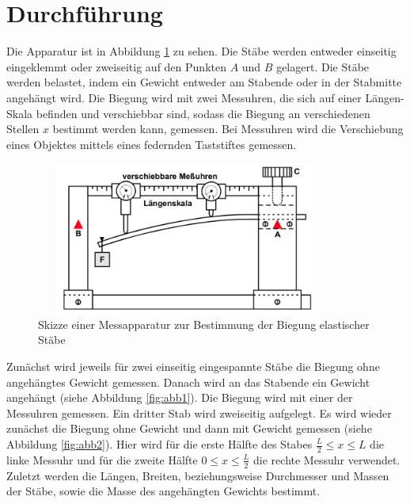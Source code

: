 \section{Durchführung}
Die Apparatur ist in Abbildung \ref{fig:abb3} zu sehen.
Die Stäbe werden entweder einseitig eingeklemmt oder zweiseitig
auf den Punkten $A$ und $B$ gelagert. Die Stäbe werden belastet, indem
ein Gewicht entweder am Stabende oder in der Stabmitte angehängt wird.
Die Biegung wird mit zwei Messuhren, die sich auf einer Längen-Skala befinden
und verschiebbar sind, sodass die Biegung an verschiedenen Stellen $x$ bestimmt
werden kann, gemessen. Bei Messuhren wird die Verschiebung eines Objektes mittels
eines federnden Taststiftes gemessen. %
\begin{figure}
    \centering
\includegraphics[width= 10cm, height= 5cm]{./plots/abb3.png}
\caption{Skizze einer Messapparatur zur Bestimmung der Biegung elastischer Stäbe}
\label{fig:abb3}
\end{figure}

\noindent Zunächst wird jeweils für zwei einseitig eingespannte Stäbe die Biegung ohne
angehängtes Gewicht gemessen. Danach wird an das Stabende ein Gewicht angehängt (siehe Abbildung \ref{fig:abb1}).
Die Biegung wird mit einer der Messuhren gemessen.
Ein dritter Stab wird
zweiseitig aufgelegt. Es wird wieder zunächst die Biegung ohne Gewicht und dann
mit Gewicht gemessen (siehe Abbildung \ref{fig:abb2}). Hier wird für die erste Hälfte des Stabes $\frac{L}{2} \leq x \leq L$
die linke Messuhr und für die zweite Hälfte $0 \leq x \leq \frac{L}{2}$ die rechte Messuhr
verwendet.
Zuletzt werden die Längen, Breiten, beziehungsweise Durchmesser und Massen der Stäbe,
sowie die Masse des angehängten Gewichts bestimmt.


\newpage



\nocite{*}
\newpage
\printbibliography

